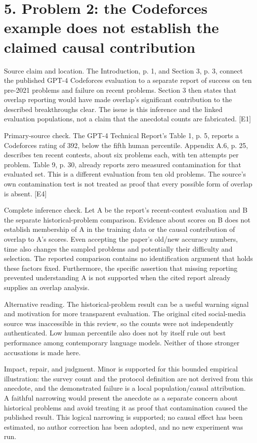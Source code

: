 \documentclass[10pt]{article}
\begin{document}
\section*{5. Problem 2: the Codeforces example does not establish the claimed causal contribution}
Source claim and location. The Introduction, p. 1, and Section 3, p. 3, connect the published GPT-4 Codeforces evaluation to a separate report of success on ten pre-2021 problems and failure on recent problems. Section 3 then states that overlap reporting would have made overlap’s significant contribution to the described breakthroughs clear. The issue is this inference and the linked evaluation populations, not a claim that the anecdotal counts are fabricated. [E1]\par
Primary-source check. The GPT-4 Technical Report’s Table 1, p. 5, reports a Codeforces rating of 392, below the fifth human percentile. Appendix A.6, p. 25, describes ten recent contests, about six problems each, with ten attempts per problem. Table 9, p. 30, already reports zero measured contamination for that evaluated set. This is a different evaluation from ten old problems. The source’s own contamination test is not treated as proof that every possible form of overlap is absent. [E4]\par
Complete inference check. Let A be the report’s recent-contest evaluation and B the separate historical-problem comparison. Evidence about scores on B does not establish membership of A in the training data or the causal contribution of overlap to A’s scores. Even accepting the paper’s old/new accuracy numbers, time also changes the sampled problems and potentially their difficulty and selection. The reported comparison contains no identification argument that holds these factors fixed. Furthermore, the specific assertion that missing reporting prevented understanding A is not supported when the cited report already supplies an overlap analysis.\par
Alternative reading. The historical-problem result can be a useful warning signal and motivation for more transparent evaluation. The original cited social-media source was inaccessible in this review, so the counts were not independently authenticated. Low human percentile also does not by itself rule out best performance among contemporary language models. Neither of those stronger accusations is made here.\par
Impact, repair, and judgment. Minor is supported for this bounded empirical illustration: the survey count and the protocol definition are not derived from this anecdote, and the demonstrated failure is a local population/causal attribution. A faithful narrowing would present the anecdote as a separate concern about historical problems and avoid treating it as proof that contamination caused the published result. This logical narrowing is supported; no causal effect has been estimated, no author correction has been adopted, and no new experiment was run.\par
\end{document}
